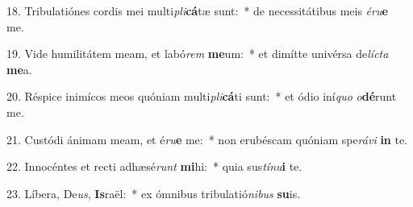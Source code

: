 18. Tribulatiónes cordis mei multi\textit{pli}\textbf{cá}tæ sunt:~*  de necessitátibus meis \textit{é}\textit{ru}\textbf{e} me.\

19. Vide humilitátem meam, et labó\textit{rem} \textbf{me}um:~*  et dimítte univérsa de\textit{líc}\textit{ta} \textbf{me}a.\

20. Réspice inimícos meos quóniam multi\textit{pli}\textbf{cá}ti sunt:~*  et ódio iní\textit{quo} \textit{o}\textbf{dé}runt me.\

21. Custódi ánimam meam, et é\textit{ru}\textbf{e} me:~*  non erubéscam quóniam spe\textit{rá}\textit{vi} \textbf{in} te.\

22. Innocéntes et recti adhæsé\textit{runt} \textbf{mi}hi:~*  quia sus\textit{tí}\textit{nu}\textbf{i} te.\

23. Líbera, De\textit{us}, \textbf{Is}raël:~*  ex ómnibus tribulatió\textit{ni}\textit{bus} \textbf{su}is.\

